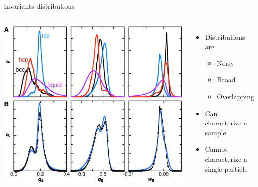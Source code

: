 \begin{frame}{Invariants distributions}
	\begin{columns}
	\includegraphics[width=\columnwidth]{gasser_invariants.jpg}
	\begin{itemize}
		\item Distributions are
		\begin{itemize}
			\item Noisy
			\item Broad
			\item Overlapping
		\end{itemize}
		\item Can characterize a sample
		\item Cannot characterize a single particle
	\end{itemize}
	\end{columns}
	\footnotesize{\citet{Gasser2001}}
\end{frame}

